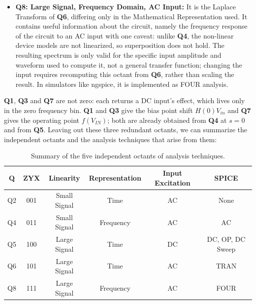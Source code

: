 \begin{itemize}
      It is the Laplace Transform of \textbf{Q5}, differing only in the
      Mathematical Representation used. The devices are not linearized, so
      there is no transfer function; the output to a constant \(V_{IN}\) is
      \(V_{OUT}(s) = \frac{f(V_{IN})}{s}\), again a single bin at zero frequency
      holding the full non-linear operating point \(f(V_{IN})\). It gives a real
      result but it is the \textbf{Q5} result rewritten, so it is
      \textbf{redundant}.
    \item \textbf{Q8: Large Signal, Frequency Domain, AC Input:}
      It is the Laplace Transform of \textbf{Q6},
      differing only in the Mathematical Representation used. It contains
      useful information about the circuit, namely the frequency response
      of the circuit to an AC input with one caveat: unlike
      \textbf{Q4}, the non-linear device models are not
      linearized, so superposition does not hold. The resulting spectrum
      is only valid for the specific input amplitude and waveform used to
      compute it, not a general transfer function; changing the input
      requires recomputing this octant from \textbf{Q6},
      rather than scaling the result. In simulators like ngspice, it is
      implemented as FOUR analysis.
\end{itemize}

\textbf{Q1}, \textbf{Q3} and \textbf{Q7} are not zero: each returns a DC input's
effect, which lives only in the zero frequency bin. \textbf{Q1} and \textbf{Q3}
give the bias point shift \(H(0) V_{in}\) and \textbf{Q7} gives the operating point
\(f(V_{IN})\); both are already obtained from \textbf{Q4} at \(s = 0\) and from
\textbf{Q5}. Leaving out these three redundant octants, we can summarize the
independent octants and the analysis techniques that arise from them:
\begin{table}[H]
    \centering
    \begin{tabular}{|c|c|c|c|c|c|}\hline
      \textbf{Q} & \textbf{ZYX} & \textbf{Linearity} & \textbf{Representation} & \textbf{Input Excitation} & \textbf{SPICE} \\ \hline
      Q2 & 001 & Small Signal & Time      & AC & None \\ \hline
      Q4 & 011 & Small Signal & Frequency & AC & AC \\ \hline
      Q5 & 100 & Large Signal & Time      & DC & DC, OP, DC Sweep \\ \hline
      Q6 & 101 & Large Signal & Time      & AC & TRAN \\ \hline
      Q8 & 111 & Large Signal & Frequency & AC & FOUR \\ \hline
    \end{tabular}
    \caption{Summary of the five independent octants of analysis techniques.}\label{tab:quadrant-summary}
\end{table}

